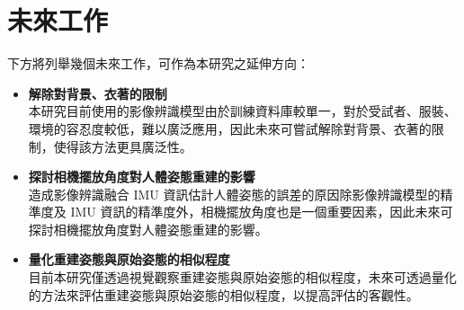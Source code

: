 \section{未來工作}
下方將列舉幾個未來工作，可作為本研究之延伸方向：

\begin{itemize}
    \item \textbf{解除對背景、衣著的限制}
    \\ 本研究目前使用的影像辨識模型由於訓練資料庫較單一，對於受試者、服裝、環境的容忍度較低，難以廣泛應用，因此未來可嘗試解除對背景、衣著的限制，使得該方法更具廣泛性。
    \item \textbf{探討相機擺放角度對人體姿態重建的影響}
    \\ 造成影像辨識融合 IMU 資訊估計人體姿態的誤差的原因除影像辨識模型的精準度及 IMU 資訊的精準度外，相機擺放角度也是一個重要因素，因此未來可探討相機擺放角度對人體姿態重建的影響。
    \item \textbf{量化重建姿態與原始姿態的相似程度}
    \\ 目前本研究僅透過視覺觀察重建姿態與原始姿態的相似程度，未來可透過量化的方法來評估重建姿態與原始姿態的相似程度，以提高評估的客觀性。
\end{itemize}

\clearpage